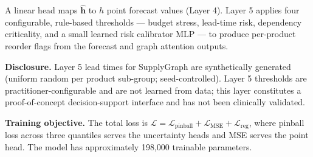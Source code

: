 A linear head maps $\hat{\mathbf{h}}$ to $h$ point forecast
values (Layer 4). Layer 5 applies four configurable, rule-based
thresholds — budget stress, lead-time risk, dependency criticality,
and a small learned risk calibrator MLP — to produce per-product
reorder flags from the forecast and graph attention outputs.

\smallskip
\noindent\textbf{Disclosure.} Layer 5 lead times for SupplyGraph
are synthetically generated (uniform random per product sub-group;
seed-controlled). Layer 5 thresholds are practitioner-configurable
and are not learned from data; this layer constitutes a
proof-of-concept decision-support interface and has not been
clinically validated.

\smallskip
\noindent\textbf{Training objective.} The total loss is
$\mathcal{L} = \mathcal{L}_{\mathrm{pinball}} +
               \mathcal{L}_{\mathrm{MSE}} +
               \mathcal{L}_{\mathrm{reg}}$,
where pinball loss across three quantiles serves the uncertainty
heads and MSE serves the point head. The model has approximately
198,000 trainable parameters.

